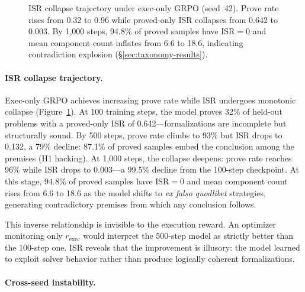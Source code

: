 \begin{figure}[t]
\centering
\caption{ISR collapse trajectory under exec-only GRPO (seed~42). Prove rate rises from 0.32 to 0.96 while proved-only ISR collapses from 0.642 to 0.003. By 1{,}000 steps, 94.8\% of proved samples have $\text{ISR}{=}0$ and mean component count inflates from 6.6 to 18.6, indicating contradiction explosion (\S\ref{sec:taxonomy-results}).}
\label{fig:isr-collapse}
\end{figure}

\paragraph{ISR collapse trajectory.}

Exec-only GRPO achieves increasing prove rate while ISR undergoes monotonic collapse (Figure~\ref{fig:isr-collapse}).
At 100 training steps, the model proves 32\% of held-out problems with a proved-only ISR of 0.642---formalizations are incomplete but structurally sound.
By 500 steps, prove rate climbs to 93\% but ISR drops to 0.132, a 79\% decline: 87.1\% of proved samples embed the conclusion among the premises (H1 hacking).
At 1{,}000 steps, the collapse deepens: prove rate reaches 96\% while ISR drops to 0.003---a 99.5\% decline from the 100-step checkpoint.
At this stage, 94.8\% of proved samples have $\text{ISR}{=}0$ and mean component count rises from 6.6 to 18.6 as the model shifts to \emph{ex falso quodlibet} strategies, generating contradictory premises from which any conclusion follows.

This inverse relationship is invisible to the execution reward.
An optimizer monitoring only $r_{\text{exec}}$ would interpret the 500-step model as strictly better than the 100-step one.
ISR reveals that the improvement is illusory: the model learned to exploit solver behavior rather than produce logically coherent formalizations.

\paragraph{Cross-seed instability.}

